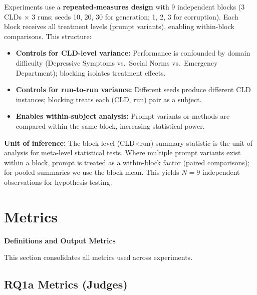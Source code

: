 Experiments use a \textbf{repeated-measures design} with 9 independent blocks (3 CLDs $\times$ 3 runs; seeds 10, 20, 30 for generation; 1, 2, 3 for corruption). Each block receives all treatment levels (prompt variants), enabling within-block comparisons. This structure:

\begin{itemize}[noitemsep]
    \item \textbf{Controls for CLD-level variance:} Performance is confounded by domain difficulty (Depressive Symptoms vs.\ Social Norms vs.\ Emergency Department); blocking isolates treatment effects.
    \item \textbf{Controls for run-to-run variance:} Different seeds produce different CLD instances; blocking treats each (CLD, run) pair as a subject.
    \item \textbf{Enables within-subject analysis:} Prompt variants or methods are compared within the same block, increasing statistical power.
\end{itemize}

\textbf{Unit of inference:} The block-level (CLD$\times$run) summary statistic is the unit of analysis for meta-level statistical tests. Where multiple prompt variants exist within a block, prompt is treated as a within-block factor (paired comparisons); for pooled summaries we use the block mean. This yields $N=9$ independent observations for hypothesis testing.

\section{Metrics}

\noindent\textbf{Definitions and Output Metrics}
\label{sec:metrics_definitions}

This section consolidates all metrics used across experiments.

\subsection{RQ1a Metrics (Judges)}

